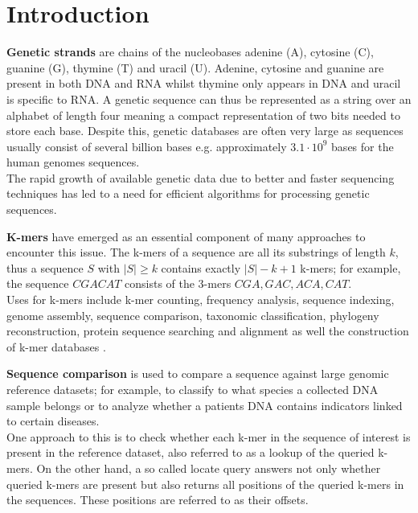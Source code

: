 \documentclass[a4paper,titlepage,onecolumn,oneside,12pt,nenglish,titlepage=firstiscover]{scrbook}
\theoremstyle{plain} %
\theoremstyle{definition} %
\theoremstyle{remark} %
\theoremstyle{plain}
\begin{document}
\newpage
\tableofcontents
\newpage

\chapter{Introduction} \label{chap:introduction}
\textbf{Genetic strands} are chains of the nucleobases adenine (A), cytosine (C), guanine (G), thymine (T) and uracil (U). Adenine, cytosine and guanine are present in both DNA and RNA whilst thymine only appears in DNA and uracil is specific to RNA. A genetic sequence can thus be represented as a string over an alphabet of length four meaning a compact representation of two bits needed to store each base. Despite this, genetic databases are often very large as sequences usually consist of several billion bases e.g. approximately $3.1 \cdot 10^9$ bases for the human genomes sequences. \\
The rapid growth of available genetic data due to better and faster sequencing techniques has led to a need for efficient algorithms for processing genetic sequences.

\textbf{K-mers} have emerged as an essential component of many approaches to encounter this issue. The k-mers of a sequence are all its substrings of length $k$, thus a sequence $S$ with $|S| \geq k$ contains exactly $|S|-k+1$ k-mers; for example, the sequence $CGACAT$ consists of the 3-mers $CGA,GAC,ACA,CAT$.\\
Uses for k-mers include k-mer counting, frequency analysis, sequence indexing, genome assembly, sequence comparison, taxonomic classification, phylogeny reconstruction, protein sequence searching and alignment as well the construction of k-mer databases \cite{moeckel_survey_2024}. 

\textbf{Sequence comparison} is used to compare a sequence against large genomic reference datasets; for example, to classify to what species a collected DNA sample belongs or to analyze whether a patients DNA contains indicators linked to certain diseases.\\
One approach to this is to check whether each k-mer in the sequence of interest is present in the reference dataset, also referred to as a lookup of the queried k-mers. On the other hand, a so called locate query answers not only whether queried k-mers are present but also returns all positions of the queried k-mers in the sequences. These positions are referred to as their offsets.
\end{document}
